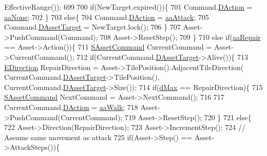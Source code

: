 \begin{DoxyCode}
      EffectiveRange());
699             
700             \textcolor{keywordflow}{if}(NewTarget.expired())\{
701                 Command.\hyperlink{structSAssetCommand_a8edd3b3d59a76d5514ba403bc8076a75}{DAction} = \hyperlink{GameDataTypes_8h_ab47668e651a3032cfb9c40ea2d60d670ac17cc5a0035320c060d7f8074143b507}{aaNone};
702             \}
703             \textcolor{keywordflow}{else}\{
704                 Command.\hyperlink{structSAssetCommand_a8edd3b3d59a76d5514ba403bc8076a75}{DAction} = \hyperlink{GameDataTypes_8h_ab47668e651a3032cfb9c40ea2d60d670a948eefd20b9e43d3b4cfcf613774716d}{aaAttack};
705                 Command.\hyperlink{structSAssetCommand_a3d9b43f6e59c386c48c41a65448a0c39}{DAssetTarget} = NewTarget.lock();
706             \}
707             Asset->PushCommand(Command);
708             Asset->ResetStep();
709         \}
710         \textcolor{keywordflow}{else} \textcolor{keywordflow}{if}(\hyperlink{GameDataTypes_8h_ab47668e651a3032cfb9c40ea2d60d670a85399def907073717f41849c8f09eba5}{aaRepair} == Asset->Action())\{
711             \hyperlink{structSAssetCommand}{SAssetCommand} CurrentCommand = Asset->CurrentCommand();
712             \textcolor{keywordflow}{if}(CurrentCommand.\hyperlink{structSAssetCommand_a3d9b43f6e59c386c48c41a65448a0c39}{DAssetTarget}->Alive())\{
713                 \hyperlink{GameDataTypes_8h_acb2b033915f6659a71a38b5aa6e4eb42}{EDirection} RepairDirection = Asset->TilePosition().AdjacentTileDirection(
      CurrentCommand.\hyperlink{structSAssetCommand_a3d9b43f6e59c386c48c41a65448a0c39}{DAssetTarget}->TilePosition(), CurrentCommand.\hyperlink{structSAssetCommand_a3d9b43f6e59c386c48c41a65448a0c39}{DAssetTarget}->Size());
714                 \textcolor{keywordflow}{if}(\hyperlink{GameDataTypes_8h_acb2b033915f6659a71a38b5aa6e4eb42af6546049275557ce0ade2ceee042a319}{dMax} == RepairDirection)\{
715                     \hyperlink{structSAssetCommand}{SAssetCommand} NextCommand = Asset->NextCommand();
716                     
717                     CurrentCommand.\hyperlink{structSAssetCommand_a8edd3b3d59a76d5514ba403bc8076a75}{DAction} = \hyperlink{GameDataTypes_8h_ab47668e651a3032cfb9c40ea2d60d670a60ca9010aa62b73c1aab838ff4bf7276}{aaWalk};
718                     Asset->PushCommand(CurrentCommand);
719                     Asset->ResetStep();
720                 \}
721                 \textcolor{keywordflow}{else}\{
722                     Asset->Direction(RepairDirection);
723                     Asset->IncrementStep();
724                     \textcolor{comment}{// Assume same movement as attack}
725                     \textcolor{keywordflow}{if}(Asset->Step() == Asset->AttackSteps())\{

\end{DoxyCode}
